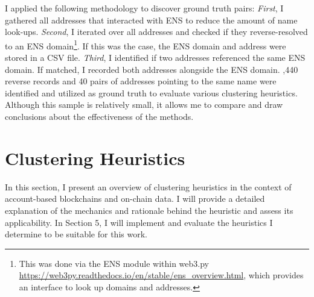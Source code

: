 \documentclass[12pt,a4paper,titlepage,oneside,english]{article}
\begin{document}
I applied the following methodology to discover ground truth pairs: \textit{First}, I gathered all addresses that interacted with ENS to reduce the amount of name look-ups. \textit{Second}, I iterated over all addresses and checked if they reverse-resolved to an ENS domain\footnote{This was done via the ENS module within web3.py \url{https://web3py.readthedocs.io/en/stable/ens_overview.html}, which provides an interface to look up domains and addresses.}. If this was the case, the ENS domain and address were stored in a CSV file. \textit{Third}, I identified if two addresses referenced the same ENS domain. If matched, I recorded both addresses alongside the ENS domain. ,440 reverse records and 40 pairs of addresses pointing to the same name were identified and utilized as ground truth to evaluate various clustering heuristics. Although this sample is relatively small, it allows me to compare and draw conclusions about the effectiveness of the methods.



\section{Clustering Heuristics}
In this section, I present an overview of clustering heuristics in the context of account-based blockchains and on-chain data. I will provide a detailed explanation of the mechanics and rationale behind the heuristic and assess its applicability. 
In Section 5, I will implement and evaluate the heuristics I determine to be suitable for this work.
\end{document}
